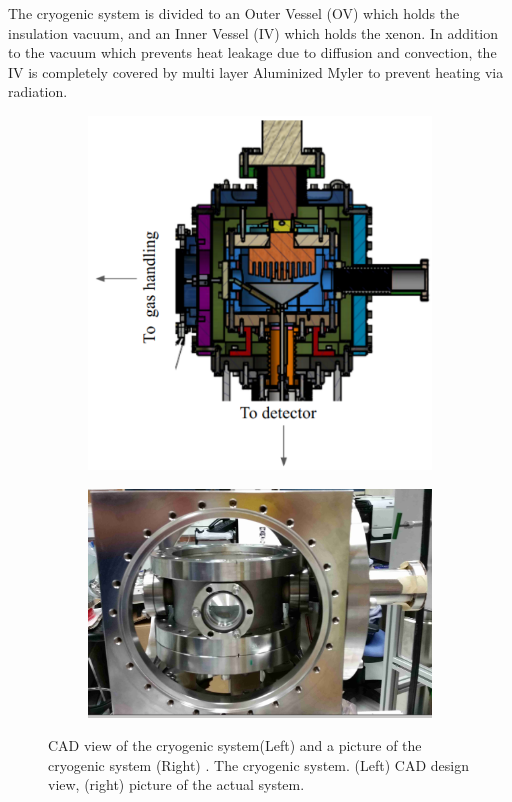 The cryogenic system is divided to an Outer Vessel (OV) which holds 
the insulation vacuum, and an Inner Vessel (IV) which holds the xenon. In addition to the vacuum which prevents heat leakage due to diffusion and convection, the IV is completely covered by multi layer Aluminized Myler to prevent heating via radiation.  

\begin{figure}[h]
\centering
\begin{subfigure}[c]{0.35\textheight}
\includegraphics[width=\textwidth]{cryoMirror.png}
\end{subfigure}
\begin{subfigure}[c]{0.25\textheight}
\includegraphics[width=\textwidth]{cryoOpenCrop.png}
\end{subfigure}
\caption{ CAD view of the cryogenic system(Left) and a picture of the cryogenic system (Right) . 
The cryogenic system. (Left) CAD design view, 
(right) picture of the actual system.
\label{fig:cryo}}
\end{figure}




